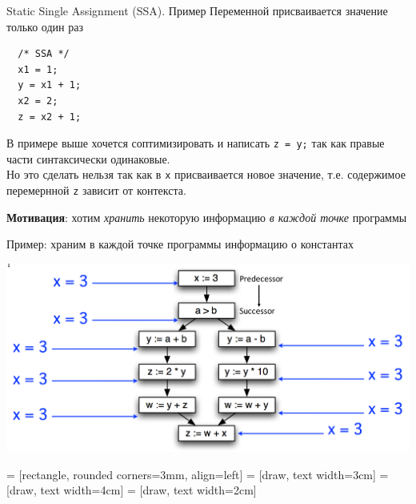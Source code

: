 \documentclass[aspectratio=169
  , xcolor={svgnames}
  , hyperref={ colorlinks,citecolor=DeepPink4
             , linkcolor=DarkRed,urlcolor=DarkBlue}
  , russian
  ]{beamer}
\theoremstyle{exerciseStyle1}
\begin{document}
\begin{frame}[fragile]{Static Single Assignment (SSA). Пример}
Переменной присваивается значение только один раз
\hfill
\begin{minipage}[t]{0.48\linewidth}
  \begin{verbatim}
  /* SSA */
  x1 = 1;
  y = x1 + 1;
  x2 = 2;
  z = x2 + 1;
  \end{verbatim}
\end{minipage}\vspace{1em}

В примере выше хочется соптимизировать и написать \texttt{z = y;} так как правые части синтаксически одинаковые.\\

Но это сделать нельзя так как в \texttt{x} присваивается новое значение, т.е. содержимое перемернной \texttt{z} зависит от контекста.\vspace{1em}

\textbf{Мотивация}: хотим \emph{хранить} некоторую информацию \emph{в каждой точке} программы

\end{frame}

\begin{frame}[fragile]{Пример: храним в каждой точке программы информацию о константах}
\begin{center}
\includegraphics[width=.9\textwidth]{figures/ssa-search-for-constants}
\end{center}
\end{frame}

 = [rectangle, rounded corners=3mm, align=left]
 = [draw, text width=3cm]
 = [draw, text width=4cm]
 = [draw, text width=2cm]
\end{document}
